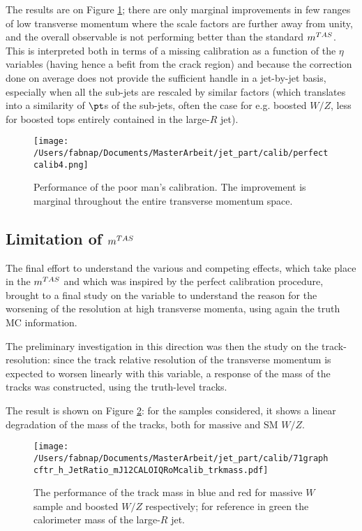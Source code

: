 The results are on Figure \ref{fig:perfcalib4}; there are only marginal improvements in few ranges of low transverse momentum where the scale factors are further away from unity, and the overall observable is not performing better than the standard $m^{TAS}$. This is interpreted both in terms of a missing calibration as a function of the $\eta$ variables (having hence a befit from the crack region) and because the correction done on average does not provide the sufficient handle in a jet-by-jet basis, especially when all the sub-jets are rescaled by similar factors (which translates into a similarity of $\pt$s of the sub-jets, often the case for e.g. boosted $W/Z$, less for boosted tops entirely contained in the large-$R$ jet).

\begin{figure}[!ht]
  \centering
      \texttt{[image: /Users/fabnap/Documents/MasterArbeit/jet\_part/calib/perfectcalib4.png]}
  \caption[Simple calibration]{Performance of the poor man's calibration. The improvement is marginal throughout the entire transverse momentum space.}
  \label{fig:perfcalib4}
\end{figure}

\subsection{Limitation of $m^{TAS}$}
The final effort to understand the various and competing effects, which take place in the $m^{TAS}$ and which was inspired by the perfect calibration procedure, brought to a final study on the variable to understand the reason for the worsening of the resolution at high transverse momenta, using again the truth MC information.

The preliminary investigation in this direction was then the study on the track-resolution: since the track relative resolution of the transverse momentum is expected to worsen linearly with this variable, a response of the mass of the tracks was constructed, using the truth-level tracks.

The result is shown on Figure \ref{fig:trackdegrade}: for the samples considered, it shows a linear degradation of the mass of the tracks, both for massive and SM $W/Z$.

\begin{figure}[!ht]
  \centering
      \texttt{[image: /Users/fabnap/Documents/MasterArbeit/jet\_part/calib/71graphcftr\_h\_JetRatio\_mJ12CALOIQRoMcalib\_trkmass.pdf]}
  \caption[Track mass degradation in tops and massive $W/Z$]{The performance of the track mass in blue and red for massive $W$ sample and boosted $W/Z$ respectively; for reference in green the calorimeter mass of the large-$R$ jet.}
  \label{fig:trackdegrade}
\end{figure}

